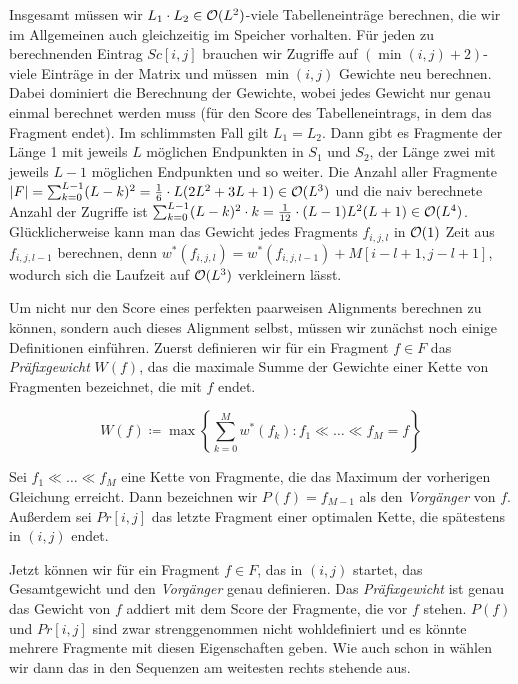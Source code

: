 \begin{beweis}
	Insgesamt müssen wir $L_1 \cdot L_2 \in \mathcal{O}(L^2)$-viele Tabelleneinträge berechnen, die wir im Allgemeinen auch gleichzeitig im Speicher vorhalten. Für jeden zu berechnenden Eintrag $Sc[i,j]$ brauchen wir Zugriffe auf $(\min(i,j) + 2)$-viele Einträge in der Matrix und müssen $\min(i,j)$ Gewichte neu berechnen. Dabei dominiert die Berechnung der Gewichte, wobei jedes Gewicht nur genau einmal berechnet werden muss (für den Score des Tabelleneintrags, in dem das Fragment endet). Im schlimmsten Fall gilt $L_1 = L_2$. Dann gibt es Fragmente der Länge 1 mit jeweils $L$ möglichen Endpunkten in $S_1$ und $S_2$, der Länge zwei mit jeweils $L-1$ möglichen Endpunkten und so weiter. Die Anzahl aller Fragmente $|F| = \sum_{k=0}^{L-1}(L-k)^2 = \frac{1}{6} \cdot L(2L^2+3L+1) \in \mathcal{O}(L^3)$ und die naiv berechnete Anzahl der Zugriffe ist $\sum_{k=0}^{L-1}(L-k)^2\cdot k = \frac{1}{12} \cdot (L-1)L^2(L+1) \in \mathcal{O}(L^4)$. Glücklicherweise kann man das Gewicht jedes Fragments $f_{i,j,l}$ in $\mathcal{O}(1)$ Zeit aus $f_{i,j,l-1}$ berechnen, denn $w^*(f_{i,j,l}) = w^*(f_{i,j,l-1}) + M[i\!-\!l\!+\!1, j\!-\!l\!+\!1]$, wodurch sich die Laufzeit auf $\mathcal{O}(L^3)$ verkleinern lässt.
\end{beweis}

Um nicht nur den Score eines perfekten paarweisen Alignments berechnen zu können, sondern auch dieses Alignment selbst, müssen wir zunächst noch einige Definitionen einführen. Zuerst definieren wir für ein Fragment $f \in F$ das \emph{Präfixgewicht} $W(f)$, das die maximale Summe der Gewichte einer Kette von Fragmenten bezeichnet, die mit $f$ endet.

\begin{equation}
	W(f) \coloneqq \max \left\{ \sum_{k=0}^{M} w^*(f_k) : f_1 \ll \dots \ll f_M=f \right\}
\end{equation}

\begin{definition}[Vorgänger]
	Sei $f_1 \ll \dots \ll f_M$ eine Kette von Fragmente, die das Maximum der vorherigen Gleichung erreicht. Dann bezeichnen wir $P(f) = f_{M-1}$ als den \emph{Vorgänger} von $f$. Außerdem sei $Pr[i,j]$ das letzte Fragment einer optimalen Kette, die spätestens in $(i,j)$ endet. 
\end{definition}

Jetzt können wir für ein Fragment $f \in F$, das in $(i,j)$ startet, das Gesamtgewicht und den \emph{Vorgänger} genau definieren. Das \emph{Präfixgewicht} ist genau das Gewicht von $f$ addiert mit dem Score der Fragmente, die vor $f$ stehen. $P(f)$ und $Pr[i,j]$ sind zwar strenggenommen nicht wohldefiniert und es könnte mehrere Fragmente mit diesen Eigenschaften geben. Wie auch schon in \cite{mdw96} wählen wir dann das in den Sequenzen am weitesten rechts stehende aus.

